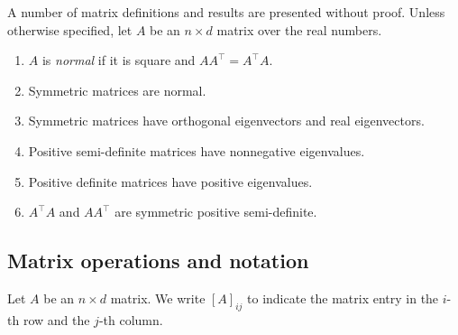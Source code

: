A number of matrix definitions and results are presented without proof.
Unless otherwise specified, let \(A\) be an \(n \times d\) matrix over the real numbers.

\begin{enumerate}
    \item \(A\) is \textit{normal} if it is square and \(AA^\top = A^\top A\).
    \item Symmetric matrices are normal.
    \item Symmetric matrices have orthogonal eigenvectors and real eigenvectors.
    \item Positive semi-definite matrices have nonnegative eigenvalues.
    \item Positive definite matrices have positive eigenvalues.
    \item \(A^\top A\) and \(AA^\top\) are symmetric positive semi-definite.
\end{enumerate}

\subsection{Matrix operations and notation}
\label{subsec:matrix-operations}

Let \(A\) be an \(n \times d\) matrix.
We write \([A]_{ij}\) to indicate the matrix entry in the \(i\)-th row and the \(j\)-th column.

